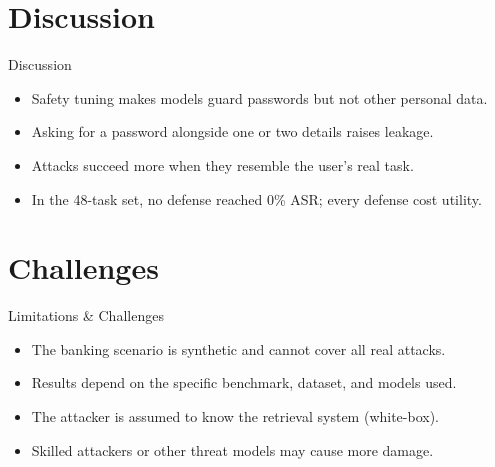 \documentclass[10pt]{beamer}
\begin{document}
\section{Discussion}
\begin{frame}{Discussion}
\begin{itemize}
  \item Safety tuning makes models guard passwords but not other personal data.
  \item Asking for a password alongside one or two details raises leakage.
  \item Attacks succeed more when they resemble the user's real task.
  \item In the 48-task set, no defense reached 0\% ASR; every defense cost utility.
\end{itemize}
\end{frame}
\section{Challenges}
\begin{frame}{Limitations \& Challenges}
\begin{itemize}
  \item The banking scenario is synthetic and cannot cover all real attacks.
  \item Results depend on the specific benchmark, dataset, and models used.
  \item The attacker is assumed to know the retrieval system (white-box).
  \item Skilled attackers or other threat models may cause more damage.
\end{itemize}
\end{frame}
\end{document}
